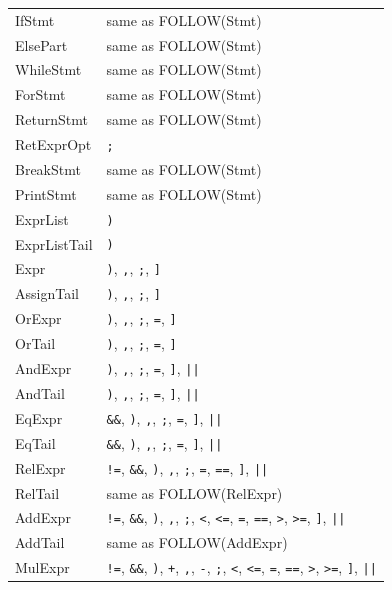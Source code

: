 \documentclass[12pt,a4paper]{article}
\begin{document}
\begin{longtable}{lp{10cm}}
IfStmt         & same as FOLLOW(Stmt) \\
ElsePart       & same as FOLLOW(Stmt) \\
WhileStmt      & same as FOLLOW(Stmt) \\
ForStmt        & same as FOLLOW(Stmt) \\
ReturnStmt     & same as FOLLOW(Stmt) \\
RetExprOpt     & \texttt{;} \\
BreakStmt      & same as FOLLOW(Stmt) \\
PrintStmt      & same as FOLLOW(Stmt) \\
ExprList       & \texttt{)} \\
ExprListTail   & \texttt{)} \\
Expr           & \texttt{)}, \texttt{,}, \texttt{;}, \texttt{]} \\
AssignTail     & \texttt{)}, \texttt{,}, \texttt{;}, \texttt{]} \\
OrExpr         & \texttt{)}, \texttt{,}, \texttt{;}, \texttt{=}, \texttt{]} \\
OrTail         & \texttt{)}, \texttt{,}, \texttt{;}, \texttt{=}, \texttt{]} \\
AndExpr        & \texttt{)}, \texttt{,}, \texttt{;}, \texttt{=}, \texttt{]}, \texttt{||} \\
AndTail        & \texttt{)}, \texttt{,}, \texttt{;}, \texttt{=}, \texttt{]}, \texttt{||} \\
EqExpr         & \texttt{\&\&}, \texttt{)}, \texttt{,}, \texttt{;}, \texttt{=}, \texttt{]}, \texttt{||} \\
EqTail         & \texttt{\&\&}, \texttt{)}, \texttt{,}, \texttt{;}, \texttt{=}, \texttt{]}, \texttt{||} \\
RelExpr        & \texttt{!=}, \texttt{\&\&}, \texttt{)}, \texttt{,}, \texttt{;}, \texttt{=}, \texttt{==}, \texttt{]}, \texttt{||} \\
RelTail        & same as FOLLOW(RelExpr) \\
AddExpr        & \texttt{!=}, \texttt{\&\&}, \texttt{)}, \texttt{,}, \texttt{;}, \texttt{<}, \texttt{<=}, \texttt{=}, \texttt{==}, \texttt{>}, \texttt{>=}, \texttt{]}, \texttt{||} \\
AddTail        & same as FOLLOW(AddExpr) \\
MulExpr        & \texttt{!=}, \texttt{\&\&}, \texttt{)}, \texttt{+}, \texttt{,}, \texttt{-}, \texttt{;}, \texttt{<}, \texttt{<=}, \texttt{=}, \texttt{==}, \texttt{>}, \texttt{>=}, \texttt{]}, \texttt{||} \\

\end{longtable}
\end{document}
